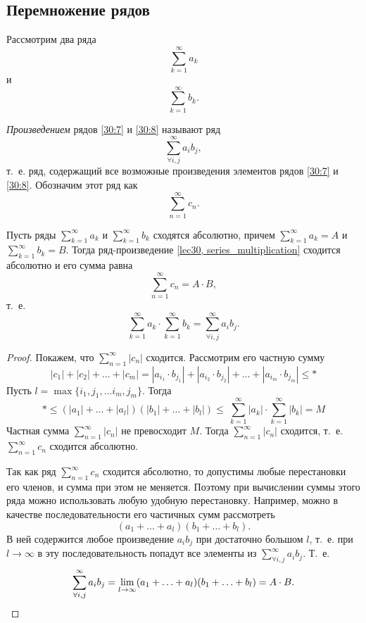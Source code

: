 \documentclass[../../main.tex]{subfiles}
\begin{document}
\subsection{Перемножение рядов}
\begin{defn}
Рассмотрим два ряда
\begin{equation}
 \label{30:7}
 \sum\limits_{k = 1}^{\infty} a_k
\end{equation}
и
\begin{equation}
 \label{30:8}
 \sum\limits_{k = 1}^{\infty} b_k.
\end{equation}

\emph{Произведением} рядов \eqref{30:7} и
\eqref{30:8} называют ряд
\[\sum\limits_{\forall i,j}^{\infty} a_i b_j,\] т.~е. ряд, содержащий все
возможные произведения элементов рядов \eqref{30:7} и
\eqref{30:8}. Обозначим этот ряд как
\begin{equation}
	\label{lec30, series_multiplication}
	\sum\limits_{n = 1}^{\infty} c_n.
\end{equation}
\end{defn}
\begin{thm}[Коши]
	Пусть ряды $\sum\limits_{k = 1}^{\infty} a_k$ и
	$\sum\limits_{k = 1}^{\infty} b_k$ сходятся абсолютно, причем
	$\sum\limits_{k = 1}^{\infty} a_k = A$ и
	$\sum\limits_{k = 1}^{\infty} b_k = B$. Тогда ряд-произведение
	\eqref{lec30, series_multiplication} сходится абсолютно и его сумма равна
	\[\sum\limits_{n = 1}^{\infty} c_n = A \cdot B, \]
	т.~е.
	\[\sum\limits_{k = 1}^{\infty} a_k \cdot
	\sum\limits_{k = 1}^{\infty} b_k =
	\sum\limits_{\forall i,j}^{\infty} a_i b_j.\]
\end{thm}
\begin{proof}
Покажем, что $\sum\limits_{n = 1}^{\infty} |c_n|$ сходится. Рассмотрим
его частную сумму
\[|c_1| + |c_2| + \ldots + |c_m| = |a_{i_1} \cdot b_{j_1}| +
|a_{i_2} \cdot b_{j_2}| + \ldots + |a_{i_m} \cdot b_{j_m}| \leq *\]
Пусть $l = \max\{i_1, j_1, \ldots i_m, j_m\}$. Тогда
\[* \leq (|a_1| + \ldots + |a_l|)(|b_1| + \ldots + |b_l|)
\leq\ \sum\limits_{k = 1}^{\infty} |a_k| \cdot
\sum\limits_{k = 1}^{\infty} |b_k| = M\]
Частная сумма $\sum\limits_{n = 1}^{\infty} |c_n|$ не превосходит $M$. Тогда 
$\sum\limits_{n = 1}^{\infty} |c_n|$ сходится, т.~е.
$\sum\limits_{n = 1}^{\infty} c_n$ сходится абсолютно.

Так как ряд $\sum\limits_{n = 1}^{\infty} c_n$ сходится абсолютно, то допустимы
любые перестановки его членов, и сумма при этом не меняется. Поэтому при
вычислении суммы этого ряда можно использовать любую удобную
перестановку. Например, можно в качестве последовательности его частичных
сумм рассмотреть \[(a_1 + \ldots + a_l)(b_1 + \ldots + b_l).\] В ней
содержится любое произведение $a_i b_j$ при достаточно большом $l$, т.~е.
при $l \to \infty$ в эту последовательность попадут все элементы из
$\sum\limits_{\forall i,j}^{\infty} a_i b_j$. Т.~е.
\[\sum\limits_{\forall i,j}^{\infty} a_i b_j =
\lim\limits_{l \to \infty} (a_1 + \ldots + a_l)(b_1 + \ldots + b_l) =
A \cdot B. \qedhere\]
\end{proof}
\end{document}
